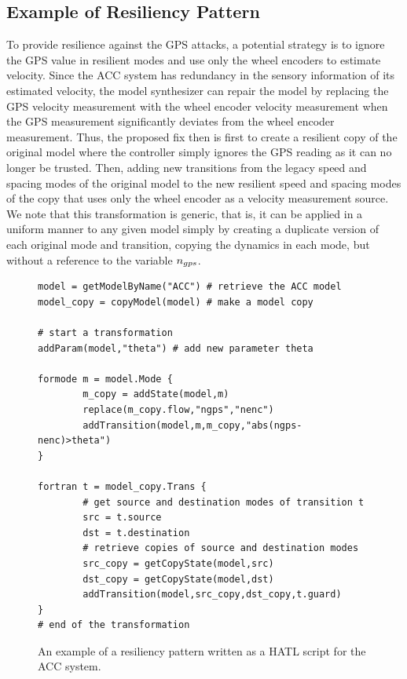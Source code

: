 \subsection{Example of Resiliency Pattern}
%
%
To provide resilience against the GPS attacks, a potential strategy is to ignore the GPS value in resilient modes and use only the wheel encoders to estimate velocity. Since the ACC system has redundancy in the sensory information of its estimated velocity, the model synthesizer can repair the model by replacing the GPS velocity measurement with the wheel encoder velocity measurement when the GPS measurement significantly deviates from the wheel encoder measurement.
%
%
Thus, the proposed fix then is first to create a resilient copy of the original model where the controller simply ignores the GPS reading as it can no longer be trusted. Then, adding new transitions from the legacy speed and spacing modes of the original model to the new resilient speed and spacing modes of the copy that uses only the wheel encoder as a velocity measurement source. We note that this transformation is generic, that is, it can be applied in a uniform manner to any given model simply by creating a duplicate version of each original mode and transition, copying the dynamics in each mode, but without a reference to the variable $n_{gps}$. 

%
%
\begin{figure}[!t]%
\begin{lstlisting}[basicstyle=\ttfamily\footnotesize, numbers=none]
model = getModelByName("ACC") # retrieve the ACC model
model_copy = copyModel(model) # make a model copy 
	
# start a transformation  
addParam(model,"theta") # add new parameter theta
	
formode m = model.Mode {
		m_copy = addState(model,m)
		replace(m_copy.flow,"ngps","nenc")
		addTransition(model,m,m_copy,"abs(ngps-nenc)>theta")
}

fortran t = model_copy.Trans {
		# get source and destination modes of transition t
		src = t.source	
		dst = t.destination 
		# retrieve copies of source and destination modes 
		src_copy = getCopyState(model,src)  
		dst_copy = getCopyState(model,dst) 
		addTransition(model,src_copy,dst_copy,t.guard)
}
# end of the transformation
\end{lstlisting}
\caption{An example of a resiliency pattern written as a HATL script for the ACC system.}%
%
\end{figure}
%
%


